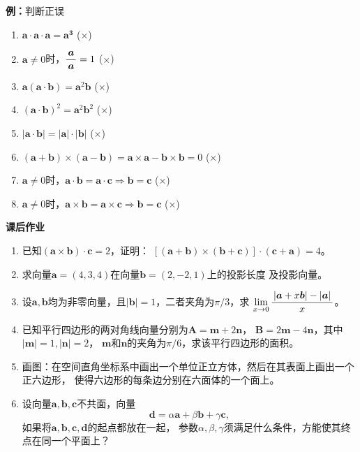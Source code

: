 {\bf 例：}判断正误
\begin{enumerate}[(1)]
  \setlength{\itemindent}{1cm}
  \item $\bm{a}\cdot\bm{a}\cdot\bm{a}=\bm{a^3}$
  \quad(\;${\times}$\;)
  \item $\bm{a}\ne 0$时，$\displaystyle\frac{\,{\bm{a}}\,}{\,{\bm{a}}\,}=1$
  \quad(\;${\times}$\;)
  \item $\bm{a}(\bm{a}\cdot\bm{b})=\bm{a}^2\bm{b}$
  \quad(\;${\times}$\;)
  \item $(\bm{a}\cdot\bm{b})^2=\bm{a}^2\bm{b}^2$
  \quad(\;${\times}$\;)
  \item $|\bm{a}\cdot\bm{b}|=|\bm{a}|\cdot|\bm{b}|$
  \quad(\;${\times}$\;)
  \item $(\bm{a}+\bm{b})\times(\bm{a}-\bm{b})=\bm{a}\times\bm{a}
  -\bm{b}\times\bm{b}=0$
  \quad(\;${\times}$\;)
  \item $\bm{a}\ne
  0$时，$\bm{a}\cdot\bm{b}=\bm{a}\cdot\bm{c}\Rightarrow\bm{b}=\bm{c}$
  \quad(\;${\times}$\;)
  \item $\bm{a}\ne
  0$时，$\bm{a}\times\bm{b}=\bm{a}\times\bm{c}\Rightarrow\bm{b}=\bm{c}$
  \quad(\;${\times}$\;)
\end{enumerate}

\begin{ext}
	{\bf 课后作业}
	\begin{enumerate}
	  \item 已知$(\bm{a}\times\bm{b})\cdot\bm{c}=2$，证明：
	  $[(\bm{a}+\bm{b})\times(\bm{b}+\bm{c})]\cdot(\bm{c}+\bm{a})=4$。
	  \item 求向量$\bm{a}=(4,3,4)$在向量$\bm{b}=(2,-2,1)$上的投影长度
	  及投影向量。
	  \item 设$\bm{a},\bm{b}$均为非零向量，且$|\bm{b}|=1$，二者夹角为$\pi/3$，求
	  $\lim\limits_{x\to{0}}\displaystyle\frac{\,{|\bm{a}+x\bm{b}|-|\bm{a}|}\,}{\,{x}\,}$。
	  \item 已知平行四边形的两对角线向量分别为$\bm{A}=\bm{m}+2\bm{n}$，
	  $\bm{B}=2\bm{m}-4\bm{n}$，其中$|\bm{m}|=1,|\bm{n}|=2$，
	  $\bm{m}$和$\bm{n}$的夹角为$\pi/6$，求该平行四边形的面积。
	  \item 画图：在空间直角坐标系中画出一个单位正立方体，然后在其表面上画出一个正六边形，
	  使得六边形的每条边分别在六面体的一个面上。
	  \item 设向量$\bm{a},\bm{b},\bm{c}$不共面，向量
	  $$\bm{d}=\alpha\bm{a}+\beta\bm{b}+\gamma\bm{c},$$
	  如果将$\bm{a},\bm{b},\bm{c},\bm{d}$的起点都放在一起，
	  参数$\alpha,\beta,\gamma$须满足什么条件，方能使其终点在同一个平面上？
	\end{enumerate}
\end{ext}

